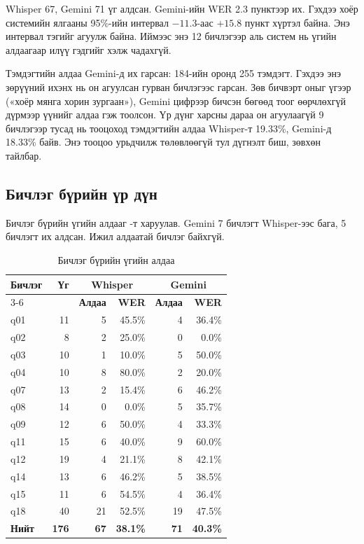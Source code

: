 Whisper 67, Gemini 71 үг алдсан. Gemini-ийн WER 2.3 пунктээр их. Гэхдээ хоёр системийн ялгааны 95\%-ийн интервал $-11.3$-аас $+15.8$ пункт хүртэл байна. Энэ интервал тэгийг агуулж байна. Иймээс энэ 12 бичлэгээр аль систем нь үгийн алдаагаар илүү гэдгийг хэлж чадахгүй.

Тэмдэгтийн алдаа Gemini-д их гарсан: 184-ийн оронд 255 тэмдэгт. Гэхдээ энэ зөрүүний ихэнх нь он агуулсан гурван бичлэгээс гарсан. Зөв бичвэрт оныг үгээр («хоёр мянга хорин зургаан»), Gemini цифрээр бичсэн бөгөөд тоог өөрчлөхгүй дүрмээр үүнийг алдаа гэж тоолсон. Үр дүнг харсны дараа он агуулаагүй 9 бичлэгээр тусад нь тооцоход тэмдэгтийн алдаа Whisper-т 19.33\%, Gemini-д 18.33\% байв. Энэ тооцоо урьдчилж төлөвлөөгүй тул дүгнэлт биш, зөвхөн тайлбар.

\subsection{Бичлэг бүрийн үр дүн}
\label{sec:res-per-utt}

Бичлэг бүрийн үгийн алдааг -т харуулав. Gemini 7 бичлэгт Whisper-ээс бага, 5 бичлэгт их алдсан. Ижил алдаатай бичлэг байхгүй.

\begin{table}[H]
\centering
\caption{Бичлэг бүрийн үгийн алдаа}
\label{tab:stt_per_utt}
\begin{tabular}{|l|r|r|r|r|r|}
\hline
\multirow{2}{*}{\textbf{Бичлэг}} & \multirow{2}{*}{\textbf{Үг}} & \multicolumn{2}{c|}{\textbf{Whisper}} & \multicolumn{2}{c|}{\textbf{Gemini}} \\
\cline{3-6}
 & & \textbf{Алдаа} & \textbf{WER} & \textbf{Алдаа} & \textbf{WER} \\
\hline
q01 & 11 & 5 & 45.5\% & 4 & 36.4\% \\
q02 & 8 & 2 & 25.0\% & 0 & 0.0\% \\
q03 & 10 & 1 & 10.0\% & 5 & 50.0\% \\
q04 & 10 & 8 & 80.0\% & 2 & 20.0\% \\
q07 & 13 & 2 & 15.4\% & 6 & 46.2\% \\
q08 & 14 & 0 & 0.0\% & 5 & 35.7\% \\
q09 & 12 & 6 & 50.0\% & 4 & 33.3\% \\
q11 & 15 & 6 & 40.0\% & 9 & 60.0\% \\
q12 & 19 & 4 & 21.1\% & 8 & 42.1\% \\
q14 & 13 & 6 & 46.2\% & 5 & 38.5\% \\
q15 & 11 & 6 & 54.5\% & 4 & 36.4\% \\
q18 & 40 & 21 & 52.5\% & 19 & 47.5\% \\
\hline
\textbf{Нийт} & \textbf{176} & \textbf{67} & \textbf{38.1\%} & \textbf{71} & \textbf{40.3\%} \\
\hline
\end{tabular}
\end{table}


